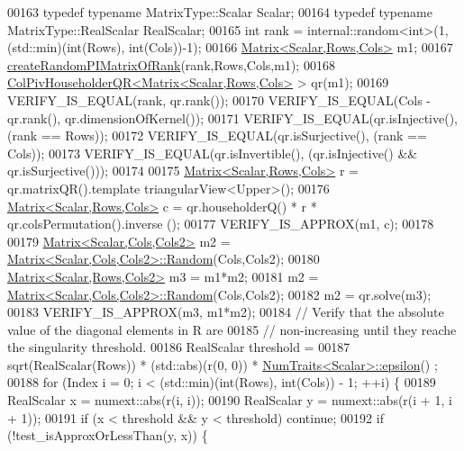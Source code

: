 \begin{DoxyCode}
00163   \textcolor{keyword}{typedef} \textcolor{keyword}{typename} MatrixType::Scalar Scalar;
00164   \textcolor{keyword}{typedef} \textcolor{keyword}{typename} MatrixType::RealScalar RealScalar;
00165   \textcolor{keywordtype}{int} rank = internal::random<int>(1, (std::min)(\textcolor{keywordtype}{int}(Rows), int(Cols))-1);
00166   \hyperlink{group___core___module_class_eigen_1_1_matrix}{Matrix<Scalar,Rows,Cols>} m1;
00167   \hyperlink{namespace_eigen_a0d9a7ddcee5c7c8defaba3628455efb2}{createRandomPIMatrixOfRank}(rank,Rows,Cols,m1);
00168   \hyperlink{group___q_r___module_class_eigen_1_1_col_piv_householder_q_r}{ColPivHouseholderQR<Matrix<Scalar,Rows,Cols>} > qr(m1);
00169   VERIFY\_IS\_EQUAL(rank, qr.rank());
00170   VERIFY\_IS\_EQUAL(Cols - qr.rank(), qr.dimensionOfKernel());
00171   VERIFY\_IS\_EQUAL(qr.isInjective(), (rank == Rows));
00172   VERIFY\_IS\_EQUAL(qr.isSurjective(), (rank == Cols));
00173   VERIFY\_IS\_EQUAL(qr.isInvertible(), (qr.isInjective() && qr.isSurjective()));
00174 
00175   \hyperlink{group___core___module_class_eigen_1_1_matrix}{Matrix<Scalar,Rows,Cols>} r = qr.matrixQR().template triangularView<Upper>();
00176   \hyperlink{group___core___module_class_eigen_1_1_matrix}{Matrix<Scalar,Rows,Cols>} c = qr.householderQ() * r * qr.colsPermutation().inverse
      ();
00177   VERIFY\_IS\_APPROX(m1, c);
00178 
00179   \hyperlink{group___core___module_class_eigen_1_1_matrix}{Matrix<Scalar,Cols,Cols2>} m2 = 
      \hyperlink{group___core___module_class_eigen_1_1_matrix}{Matrix<Scalar,Cols,Cols2>::Random}(Cols,Cols2);
00180   \hyperlink{group___core___module_class_eigen_1_1_matrix}{Matrix<Scalar,Rows,Cols2>} m3 = m1*m2;
00181   m2 = \hyperlink{group___core___module_class_eigen_1_1_matrix}{Matrix<Scalar,Cols,Cols2>::Random}(Cols,Cols2);
00182   m2 = qr.solve(m3);
00183   VERIFY\_IS\_APPROX(m3, m1*m2);
00184   \textcolor{comment}{// Verify that the absolute value of the diagonal elements in R are}
00185   \textcolor{comment}{// non-increasing until they reache the singularity threshold.}
00186   RealScalar threshold =
00187       sqrt(RealScalar(Rows)) * (std::abs)(r(0, 0)) * \hyperlink{group___core___module_struct_eigen_1_1_num_traits}{NumTraits<Scalar>::epsilon}()
      ;
00188   \textcolor{keywordflow}{for} (Index i = 0; i < (std::min)(\textcolor{keywordtype}{int}(Rows), int(Cols)) - 1; ++i) \{
00189     RealScalar x = numext::abs(r(i, i));
00190     RealScalar y = numext::abs(r(i + 1, i + 1));
00191     \textcolor{keywordflow}{if} (x < threshold && y < threshold) \textcolor{keywordflow}{continue};
00192     \textcolor{keywordflow}{if} (!test\_isApproxOrLessThan(y, x)) \{

\end{DoxyCode}
